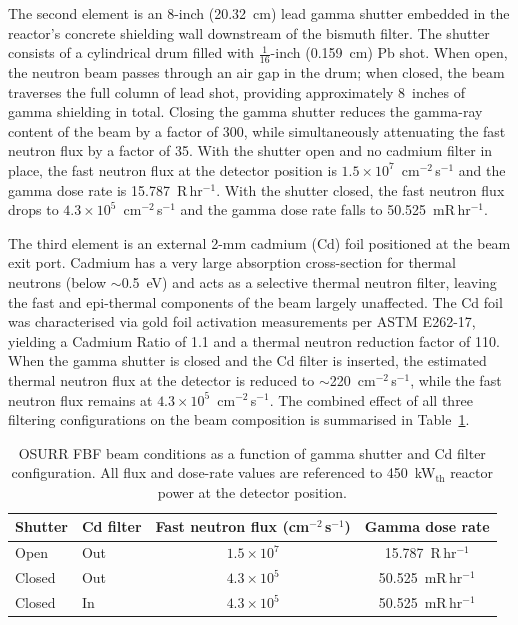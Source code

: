 The second element is an 8-inch (20.32~cm) lead gamma shutter
embedded in the reactor's concrete shielding wall downstream of
the bismuth filter.  The shutter consists of a cylindrical drum
filled with $\tfrac{1}{16}$-inch (0.159~cm) Pb shot.  When open,
the neutron beam passes through an air gap in the drum; when
closed, the beam traverses the full column of lead shot,
providing approximately 8~inches of gamma shielding in total.
Closing the gamma shutter reduces the gamma-ray content of the
beam by a factor of 300, while simultaneously attenuating the
fast neutron flux by a factor of 35.  With the shutter open and
no cadmium filter in place, the fast neutron flux at the detector
position is $1.5\times10^7$~cm$^{-2}$\,s$^{-1}$ and the gamma
dose rate is 15.787~R\,hr$^{-1}$.  With the shutter closed, the
fast neutron flux drops to $4.3\times10^5$~cm$^{-2}$\,s$^{-1}$
and the gamma dose rate falls to 50.525~mR\,hr$^{-1}$.

The third element is an external 2-mm cadmium (Cd) foil
positioned at the beam exit port.  Cadmium has a very large
absorption cross-section for thermal neutrons (below
$\sim$0.5~eV) and acts as a selective thermal neutron filter,
leaving the fast and epi-thermal components of the beam largely
unaffected.  The Cd foil was characterised via gold foil
activation measurements per ASTM E262-17, yielding a Cadmium
Ratio of 1.1 and a thermal neutron reduction factor of 110.
When the gamma shutter is closed and the Cd filter is inserted,
the estimated thermal neutron flux at the detector is reduced to
$\sim$220~cm$^{-2}$\,s$^{-1}$, while the fast neutron flux
remains at $4.3\times10^5$~cm$^{-2}$\,s$^{-1}$.  The combined
effect of all three filtering configurations on the beam
composition is summarised in Table~\ref{tab:fbf_beam_ch4}.

\begin{table}[htbp]
\centering
\caption{OSURR FBF beam conditions as a function of gamma shutter
         and Cd filter configuration.  All flux and dose-rate
         values are referenced to 450~kW$_{\mathrm{th}}$ reactor power
         at the detector position.}
\label{tab:fbf_beam_ch4}
\startsinglespace
\begin{tabular}{llcc}
\hline
Shutter & Cd filter & Fast neutron flux (cm$^{-2}$\,s$^{-1}$)
        & Gamma dose rate \\
\hline
Open   & Out & $1.5\times10^7$ & 15.787~R\,hr$^{-1}$  \\
Closed & Out & $4.3\times10^5$ & 50.525~mR\,hr$^{-1}$ \\
Closed & In  & $4.3\times10^5$ & 50.525~mR\,hr$^{-1}$ \\
\hline
\end{tabular}
\end{table}

